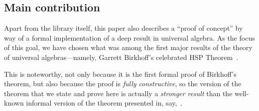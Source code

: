 \documentclass[sigplan,screen]{acmart}
\newcommand{\agdaualib}{\href{https://ualib.org}{agda-ualib}\xspace}
\newcommand{\agdaualib}{\href{anonymizedLink/agda-ualib.html}{agda-ualib}\xspace}
\begin{document}





\subsection{Main contribution}
Apart from the library itself, this paper also describes a ``proof of concept'' by way of a formal implementation of a deep result in universal algebra. As the focus of this goal, we have chosen what was among the first major results of the theory of universal algebras---namely, Garrett Birkhoff's celebrated HSP Theorem~\cite{Birkhoff:1935}.

This is noteworthy, not only because it is the first formal proof of Birkhoff's theorem, but also because the proof is \emph{fully constructive}, so the version of the theorem that we state and prove here is actually a \emph{stronger result} than the well-known informal version of the theorem presented in, say,~\cite{Bergman:2012}.
\end{document}
